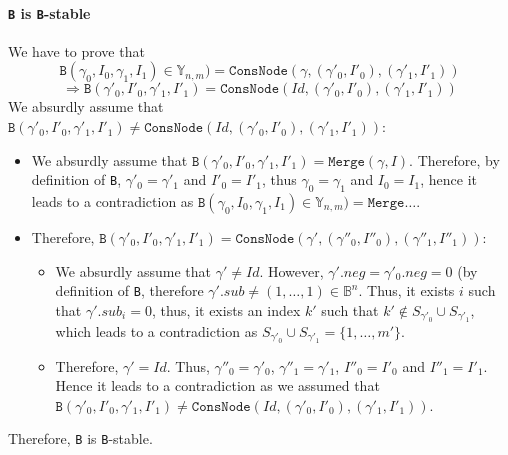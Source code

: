 \documentclass[a4paper,10pt]{article}
\newcommand{\B}{\mathbb{B}}
\newcommand{\Y}{\mathbb{Y}}
\begin{document}
\paragraph{\texttt{B} is \texttt{B}-stable}
We have to prove that
\[\mathtt{B}(\gamma_0, I_0, \gamma_1, I_1) \in \Y_{n, m}) = \mathtt{ConsNode}(\gamma, (\gamma'_0, I'_0), (\gamma'_1, I'_1))\] \[\Rightarrow \mathtt{B}(\gamma'_0, I'_0, \gamma'_1, I'_1) = \mathtt{ConsNode}(Id, (\gamma'_0, I'_0), (\gamma'_1, I'_1))\]
We absurdly assume that $\mathtt{B}(\gamma'_0, I'_0, \gamma'_1, I'_1) \neq \mathtt{ConsNode}(Id, (\gamma'_0, I'_0), (\gamma'_1, I'_1))$:\begin{itemize}
\item We absurdly assume that $\mathtt{B}(\gamma'_0, I'_0, \gamma'_1, I'_1) = \mathtt{Merge}(\gamma, I)$.
Therefore, by definition of \texttt{B}, $\gamma'_0 = \gamma'_1$ and $I'_0 = I'_1$, thus $\gamma_0 = \gamma_1$ and $I_0 = I_1$, hence it leads to a contradiction as $\mathtt{B}(\gamma_0, I_0, \gamma_1, I_1) \in \Y_{n, m}) = \mathtt{Merge} \dots$.
\item Therefore, $\mathtt{B}(\gamma'_0, I'_0, \gamma'_1, I'_1) = \mathtt{ConsNode}(\gamma', (\gamma''_0, I''_0), (\gamma''_1, I''_1))$:\begin{itemize}
\item We absurdly assume that $\gamma' \neq Id$.
However, $\gamma'.neg = \gamma'_0.neg = 0$ (by definition of \texttt{B}, therefore $\gamma'.sub \neq (1, \dots, 1) \in\B^n$.
Thus, it exists $i$ such that $\gamma'.sub_i = 0$, thus, it exists an index $k'$ such that $k'\not\in S_{\gamma'_0}\cup S_{\gamma'_1}$, which leads to a contradiction as $S_{\gamma'_0}\cup S_{\gamma'_1} = \{1, \dots, m'\}$.
\item Therefore, $\gamma' = Id$.
Thus, $\gamma''_0 = \gamma'_0$, $\gamma''_1 = \gamma'_1$, $I''_0 = I'_0$ and $I''_1 = I'_1$.
Hence it leads to a contradiction as we assumed that $\mathtt{B}(\gamma'_0, I'_0, \gamma'_1, I'_1) \neq \mathtt{ConsNode}(Id, (\gamma'_0, I'_0), (\gamma'_1, I'_1))$.
\end{itemize}
\end{itemize}

Therefore, \texttt{B} is \texttt{B}-stable.
\end{document}
